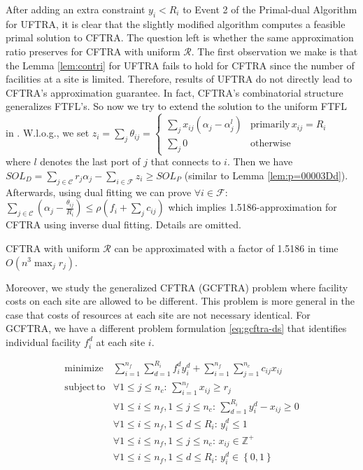 \documentclass[10pt]{llncs}
\begin{document}
After adding an extra constraint $y_{i}<R_{i}$ to Event 2 of the
Primal-dual Algorithm for UFTRA, it is clear that the slightly modified
algorithm computes a feasible primal solution to CFTRA. The question
left is whether the same approximation ratio preserves for CFTRA with
uniform $\mathcal{R}$. The first observation we make is that the
Lemma \ref{lem:contri} for UFTRA fails to hold for CFTRA since the
number of facilities at a site is limited. Therefore, results of UFTRA
do not directly lead to CFTRA's approximation guarantee. In fact,
CFTRA's combinatorial structure generalizes FTFL's. So now we try
to extend the solution to the uniform FTFL in \cite{Swamy08FTFL2.076}.
W.l.o.g., we set {\small $z_{i}=\sum_{j}\theta_{ij}=\begin{cases}
\sum_{j}x_{ij}\left(\alpha_{j}-\alpha_{j}^{l}\right) & \textrm{primarily}\, x_{ij}=R_{i}\\
\sum_{j}0 & \textrm{otherwise}\end{cases}$} where $l$ denotes the last port of $j$ that connects to $i$.
Then we have $SOL_{D}=\sum_{j\in\mathcal{C}}r_{j}\alpha_{j}-\sum_{i\in\mathcal{F}}z_{i}\geq SOL_{P}$
(similar to Lemma \ref{lem:p=00003Dd}). Afterwards, using dual fitting
we can prove $\forall i\in\mathcal{F}:$ $\sum_{j\in\mathcal{C}}\left(\alpha_{j}-\frac{\theta_{ij}}{R_{i}}\right)\leq\rho\left(f_{i}+\sum_{j}c_{ij}\right)$
which implies 1.5186-approximation for CFTRA using inverse dual fitting.
Details are omitted. 
\begin{theorem}
CFTRA with uniform $\mathcal{R}$ can be approximated with a factor
of 1.5186 in time $O\left(n^{3}\max_{j}r_{j}\right)$.
\end{theorem}
Moreover, we study the generalized CFTRA (GCFTRA) problem where facility
costs on each site are allowed to be different. This problem is more
general in the case that costs of resources at each site are not necessary
identical. For GCFTRA, we have a different problem formulation \eqref{eq:gcftra-ds}
that identifies individual facility $f_{i}^{d}$ at each site $i$. 

{\small \begin{equation}
\begin{array}{llc}
\mathrm{minimize} & \sum_{i=1}^{n_{f}}\sum_{d=1}^{R_{i}}f_{i}^{d}y_{i}^{d}+\sum_{i=1}^{n_{f}}\sum_{j=1}^{n_{c}}c_{ij}x_{ij}\\
\mathrm{subject\, to} & \forall1\leq j\leq n_{c}:\,\sum_{i=1}^{n_{f}}x_{ij}\ge r_{j}\\
 & \forall1\leq i\leq n_{f},1\leq j\leq n_{c}:\,\sum_{d=1}^{R_{i}}y_{i}^{d}-x_{ij}\geq0\\
 & \forall1\leq i\leq n_{f},1\leq d\leq R_{i}:\, y_{i}^{d}\leq1\\
 & \forall1\leq i\leq n_{f},1\leq j\leq n_{c}:\, x_{ij}\in\mathbb{Z}^{+}\\
 & \forall1\leq i\leq n_{f},1\leq d\leq R_{i}:\, y_{i}^{d}\in\left\{ 0,1\right\} \end{array}\label{eq:gcftra-ds}\end{equation}
}{\small \par}
\end{document}
